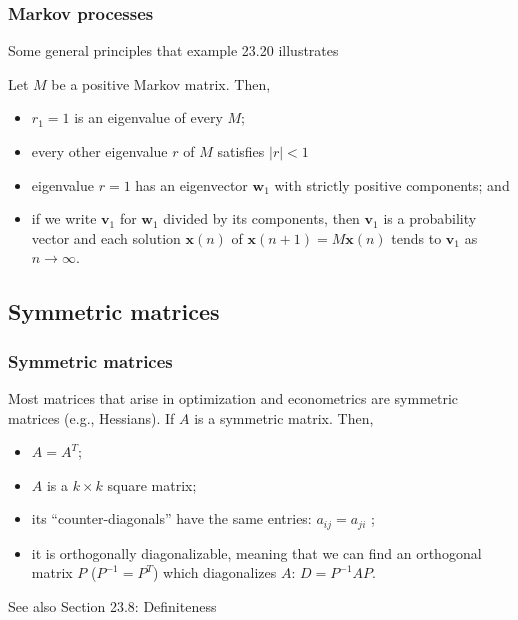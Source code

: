 \documentclass[10pt, handout]{beamer}
\begin{document}
\begin{frame}
\frametitle{Markov processes} \vskip0.1in
Some general principles that example 23.20 illustrates
\begin{theorem}[23.15]
Let $M$ be a positive Markov matrix. Then,
\begin{itemize}
\item[(a)] $r_1 = 1$ is an eigenvalue of every $M$;
\item[(b)] every other eigenvalue $r$ of $M$ satisfies $|r|<1$
\item[(c)] eigenvalue $r = 1$ has an eigenvector $\mathbf{w}_1$ with strictly positive components; and
\item[(d)] if we write $\mathbf{v}_1$ for $\mathbf{w}_1$ divided by its components, then $\mathbf{v}_1$ is a probability vector and each solution $\mathbf{x}(n)$ of $\mathbf{x}(n+1) = M\mathbf{x}(n)$ tends to $\mathbf{v}_1$ as $n \to \infty$.
\end{itemize}
\end{theorem}
\end{frame}



\subsection{Symmetric matrices}
\begin{frame}
\frametitle{Symmetric matrices} \vskip 0.1in

Most matrices that arise in optimization and econometrics are symmetric matrices (e.g., Hessians). If $A$ is a symmetric matrix. Then,
\begin{definition}
\begin{itemize}
\item[] $A = A^T$;
\item[] $A$ is a $k \times k$ square matrix;
\item[] its ``counter-diagonals'' have the same entries: $a_{ij} = a_{ji}$ ;
\item[] it is orthogonally diagonalizable, meaning that
we can find an orthogonal matrix $P$ ($P^{-1}=P^T$) which diagonalizes $A$: $D = P^{-1}AP$.
\end{itemize}
\end{definition}\vfill

See also Section 23.8: Definiteness
\end{frame}







\end{document}
